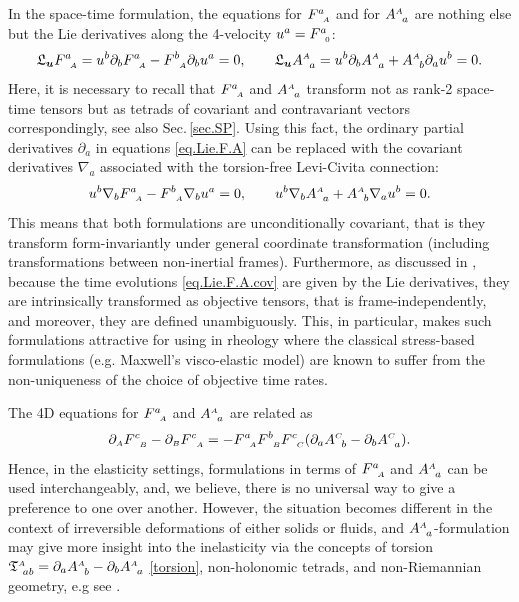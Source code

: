 \documentclass[
10pt, %
a4paper, %
oneside, %
headinclude,footinclude, %
BCOR5mm, %
]{scrartcl}
\newcommand{\Lie}{\mathfrak{L}}
\newcommand{\sA}{{\mathsmaller A}}
\newcommand{\sB}{{\mathsmaller B}}
\newcommand{\pd}{\partial}
\newcommand{\F}[2]{F^{#1}_{\ \, \mathsmaller#2}}
\newcommand{\A}[2]{A^{\mathsmaller#1}_{\ \, #2}}
\begin{document}
\begin{remark} In the space-time formulation, the equations for $ \F{a}{A} $ 
and for $ 
\A{A}{a} $ are nothing else but the Lie derivatives along the 4-velocity $ u^a = \F{a}{0}$:
\begin{equation}\label{eq.Lie.F.A}
\Lie_{\bm{u}} \F{a}{A} = u^b\pd_b \F{a}{A} - \F{b}{A}\pd_b u^a = 0, \qquad 
\Lie_{\bm{u}} \A{A}{a} = u^b \pd_b \A{A}{a} + \A{A}{b}\pd_a u^b = 0.
\end{equation}
Here, it is necessary to recall that $ \F{a}{A} $ and $ \A{A}{a} $ transform not as rank-2 
space-time tensors 
but as tetrads of covariant and contravariant vectors correspondingly, see also 
Sec.\,\ref{sec.SP}. Using 
this fact, the ordinary partial derivatives $ \pd_a $ in equations \eqref{eq.Lie.F.A} can be 
replaced with the covariant derivatives $ \nabla_a $ associated with the torsion-free Levi-Civita 
connection:
\begin{equation}\label{eq.Lie.F.A.cov}
u^b\nabla_b \F{a}{A} - \F{b}{A}\nabla_b u^a = 0, \qquad 
u^b \nabla_b \A{A}{a} + \A{A}{b}\nabla_a u^b = 0.
\end{equation}
This means that both formulations are unconditionally covariant, that is they 
transform form-invariantly under general coordinate transformation (including 
transformations between non-inertial frames).
Furthermore, as discussed in \cite{Frewer2009}, because the time evolutions 
\eqref{eq.Lie.F.A.cov} are given by the Lie derivatives, they are intrinsically 
transformed as objective tensors, that is frame-independently, and moreover, 
they 
are defined unambiguously. This, in particular, makes such formulations 
attractive 
for using in rheology where the classical stress-based formulations (e.g. 
Maxwell's visco-elastic model) are known to suffer 
from the non-uniqueness of the choice of objective time rates.
\end{remark}


\begin{remark}
The 4D equations for $ \F{a}{A} $ and $ \A{A}{a} $ are related as
\begin{equation}
\pd_\sA \F{c}{B} - \pd_\sB \F{c}{A} = -\F{a}{A}\F{b}{B}\F{c}{C}(\pd_a\A{C}{b} - \pd_b\A{C}{a}).
\end{equation}
Hence, in the elasticity settings, formulations in terms of $ \F{a}{A} $ and $ \A{A}{a} $ can be 
used interchangeably, and, we believe, there is no universal way to give a 
preference to one over another. 
However, the situation becomes different in the context of irreversible deformations of either 
solids or fluids, and $ \A{A}{a} 
$-formulation may give more insight into the inelasticity via the concepts of 
torsion $ 
\mathfrak{T}^{\sA}_{\ ab} = \pd_a\A{A}{b} - \pd_b\A{A}{a} $ \eqref{torsion}, non-holonomic tetrads, 
and non-Riemannian geometry, e.g see \cite{PRD-Torsion2019,Yavari2012}.
\end{remark}
\end{document}
